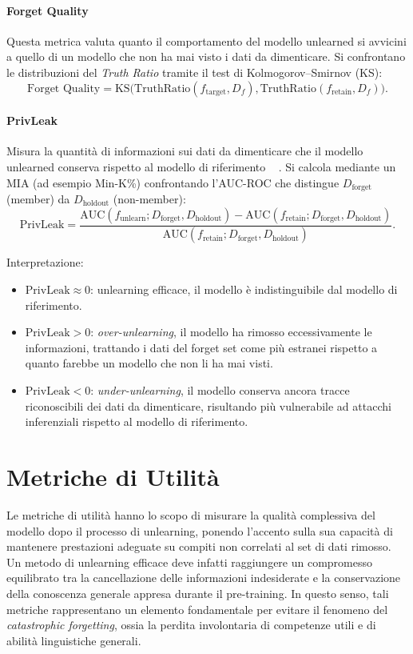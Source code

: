 \paragraph{Forget Quality}
Questa metrica valuta quanto il comportamento del modello unlearned si avvicini a quello di un modello che non ha mai visto i dati da dimenticare.  
Si confrontano le distribuzioni del \textit{Truth Ratio} tramite il test di Kolmogorov–Smirnov (KS):
\[
\text{Forget Quality} = \text{KS}\bigl(\text{TruthRatio}(f_{\text{target}}, D_f), \text{TruthRatio}(f_{\text{retain}}, D_f)\bigr).
\]

\paragraph{PrivLeak}
Misura la quantità di informazioni sui dati da dimenticare che il modello unlearned conserva rispetto al modello di riferimento ~\cite{shi2025muse} .
Si calcola mediante un MIA (ad esempio Min-K\%) confrontando l’AUC-ROC che distingue $D_{\text{forget}}$ (member) da $D_{\text{holdout}}$ (non-member):
\[
\mathrm{PrivLeak} =
\frac{
\mathrm{AUC}(f_{\text{unlearn}}; D_{\text{forget}}, D_{\text{holdout}}) 
-
\mathrm{AUC}(f_{\text{retain}}; D_{\text{forget}}, D_{\text{holdout}})
}{
\mathrm{AUC}(f_{\text{retain}}; D_{\text{forget}}, D_{\text{holdout}})
}.
\]

Interpretazione:
\begin{itemize}
    \item $\mathrm{PrivLeak} \approx 0$: unlearning efficace, il modello è indistinguibile dal modello di riferimento.
    \item $\mathrm{PrivLeak} > 0$: \emph{over-unlearning}, il modello ha rimosso eccessivamente le informazioni, trattando i dati del forget set come più estranei rispetto a quanto farebbe un modello che non li ha mai visti.
    \item $\mathrm{PrivLeak} < 0$: \emph{under-unlearning}, il modello conserva ancora tracce riconoscibili dei dati da dimenticare, risultando più vulnerabile ad attacchi inferenziali rispetto al modello di riferimento.
\end{itemize}

\section{Metriche di Utilità}

Le metriche di utilità hanno lo scopo di misurare la qualità complessiva del modello dopo il processo di unlearning, ponendo l'accento sulla sua capacità di mantenere prestazioni adeguate su compiti non correlati al set di dati rimosso.  
Un metodo di unlearning efficace deve infatti raggiungere un compromesso equilibrato tra la cancellazione delle informazioni indesiderate e la conservazione della conoscenza generale appresa durante il pre-training.  
In questo senso, tali metriche rappresentano un elemento fondamentale per evitare il fenomeno del \textit{catastrophic forgetting}, ossia la perdita involontaria di competenze utili e di abilità linguistiche generali.

